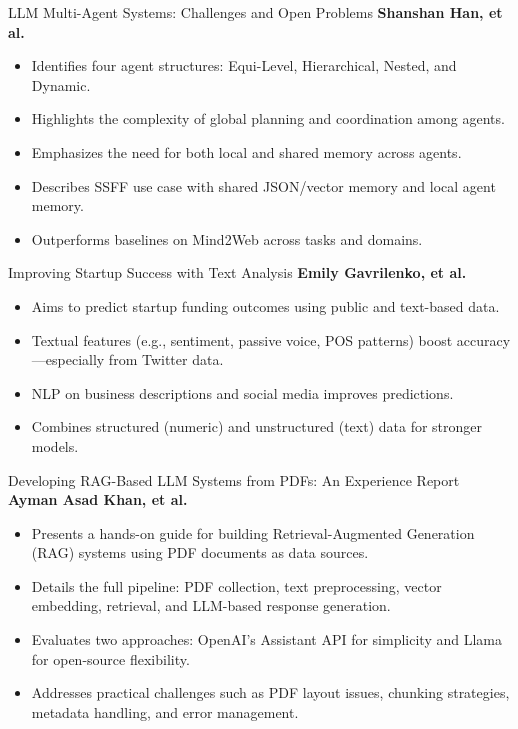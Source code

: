 \documentclass{beamer}
\begin{document}
\begin{frame}{LLM Multi-Agent Systems: Challenges and Open Problems }
\large\textbf{Shanshan Han, et al.}

\normalsize
\begin{itemize}
 \item Identifies four agent structures: Equi-Level, Hierarchical, Nested, and Dynamic.
    \item Highlights the complexity of global planning and coordination among agents.
    \item Emphasizes the need for both local and shared memory across agents.
    \item Describes SSFF use case with shared JSON/vector memory and local agent memory.
  \item Outperforms baselines on Mind2Web across tasks and domains.
\end{itemize}
\end{frame}


\begin{frame}{Improving Startup Success with Text Analysis }
\large\textbf{Emily Gavrilenko, et al.}

\normalsize
\begin{itemize}
   \item Aims to predict startup funding outcomes using public and text-based data.
    \item Textual features (e.g., sentiment, passive voice, POS patterns) boost accuracy—especially from Twitter data.
    \item NLP on business descriptions and social media improves predictions.
    \item Combines structured (numeric) and unstructured (text) data for stronger models.
\end{itemize}
\end{frame}


\begin{frame}{Developing RAG-Based LLM Systems from PDFs: An Experience Report }
\large\textbf{Ayman Asad Khan, et al.}

\normalsize
\begin{itemize}
   \item Presents a hands-on guide for building Retrieval-Augmented Generation (RAG) systems using PDF documents as data sources.
    \item Details the full pipeline: PDF collection, text preprocessing, vector embedding, retrieval, and LLM-based response generation.
    \item Evaluates two approaches: OpenAI's Assistant API for simplicity and Llama for open-source flexibility.
    \item Addresses practical challenges such as PDF layout issues, chunking strategies, metadata handling, and error management.
\end{itemize}
\end{frame}
\end{document}
